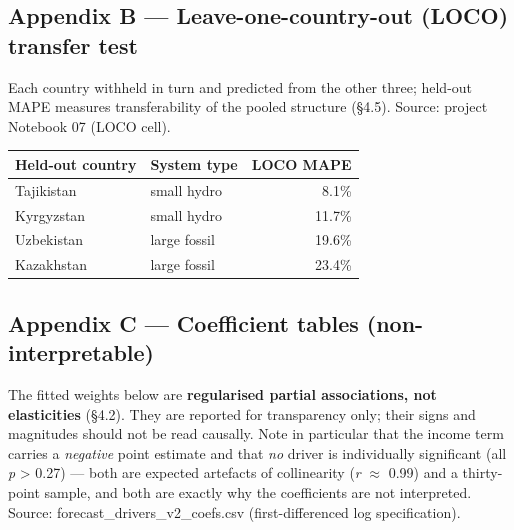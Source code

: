\documentclass[10pt,twocolumn]{article}
\begin{document}
\subsection*{Appendix B --- Leave-one-country-out (LOCO) transfer test}

Each country withheld in turn and predicted from the other three; held-out MAPE measures transferability of the pooled structure (\S{}4.5). Source: project Notebook 07 (LOCO cell).

\begin{table}[tbp]
\centering
\renewcommand{\arraystretch}{1.18}\small
\begin{tabular}{llr}
\toprule
\textbf{Held-out country} & \textbf{System type} & \textbf{LOCO MAPE} \\
\midrule
Tajikistan & small hydro & 8.1\% \\
Kyrgyzstan & small hydro & 11.7\% \\
Uzbekistan & large fossil & 19.6\% \\
Kazakhstan & large fossil & 23.4\% \\
\bottomrule
\end{tabular}
\par{}
\end{table}

\subsection*{Appendix C --- Coefficient tables (non-interpretable)}

The fitted weights below are \textbf{regularised partial associations, not elasticities} (\S{}4.2). They are reported for transparency only; their signs and magnitudes should not be read causally. Note in particular that the income term carries a \textit{negative} point estimate and that \textit{no} driver is individually significant (all \textit{p} \textgreater{} 0.27) --- both are expected artefacts of collinearity (\textit{r} $\approx$ 0.99) and a thirty-point sample, and both are exactly why the coefficients are not interpreted. Source: forecast\_drivers\_v2\_coefs.csv (first-differenced log specification).
\end{document}
